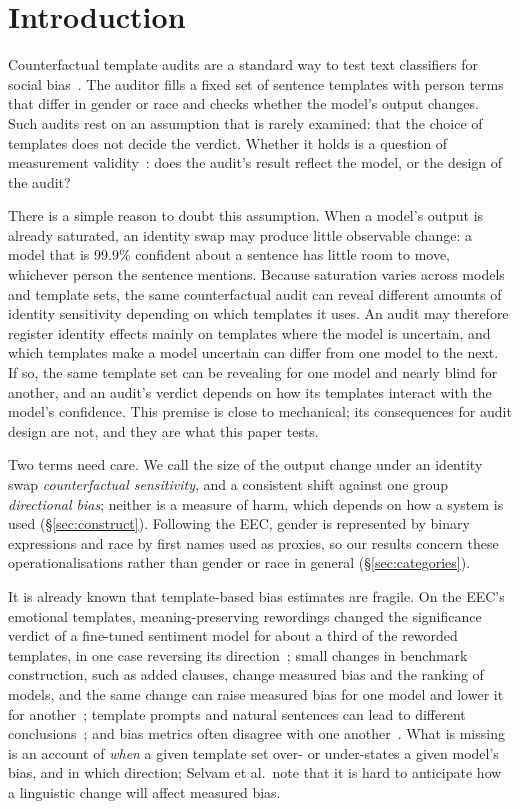 \documentclass[runningheads]{llncs}
\begin{document}
\section{Introduction}
Counterfactual template audits are a standard way to test text classifiers for
social bias~\cite{dixon2018,garg2019,prabhakaran2019,kiritchenko2018}. The
auditor fills a fixed set of sentence templates with person terms that differ
in gender or race and checks whether the model's output changes. Such audits
rest on an assumption that is rarely examined: that the choice of templates
does not decide the verdict. Whether it holds is a question of measurement
validity~\cite{jacobs2021}: does the audit's result reflect the model, or the
design of the audit?

There is a simple reason to doubt this assumption. When a model's output is already
saturated, an identity swap may produce little observable change: a model that
is 99.9\% confident about a sentence has little room to move, whichever person
the sentence mentions. Because saturation varies across models and template
sets, the same counterfactual audit can reveal different amounts of identity
sensitivity depending on which templates it uses. An audit may therefore
register identity effects mainly on templates where the model is uncertain,
and which templates make a model uncertain can differ from one model to the
next. If so, the same template set can be
revealing for one model and nearly blind for another, and an audit's verdict
depends on how its templates interact with the model's confidence. This
premise is close to mechanical; its consequences for audit design are not, and
they are what this paper tests.

Two terms need care. We call the size of the output change under an identity
swap \emph{counterfactual sensitivity}, and a consistent shift against one
group \emph{directional bias}; neither is a measure of harm, which depends on
how a system is used (\S\ref{sec:construct}). Following the EEC, gender is
represented by binary expressions and race by first names used as proxies, so
our results concern these operationalisations rather than gender or race in
general (\S\ref{sec:categories}).

It is already known that template-based bias estimates are fragile. On the
EEC's emotional templates, meaning-preserving rewordings changed the
significance verdict of a fine-tuned sentiment model for about a third of the
reworded templates, in one case reversing its direction~\cite{seshadri2022}; small
changes in benchmark construction, such as added clauses, change measured bias
and the ranking of models, and the same change can raise measured bias for one
model and lower it for another~\cite{selvam2023}; template prompts and natural
sentences can lead to different conclusions~\cite{alnegheimish2022}; and bias
metrics often disagree with one another~\cite{delobelle2022}. What is missing
is an account of \emph{when} a given template set over- or under-states a given
model's bias, and in which direction; Selvam et al.\ note that it is hard to
anticipate how a linguistic change will affect measured bias.
\end{document}
